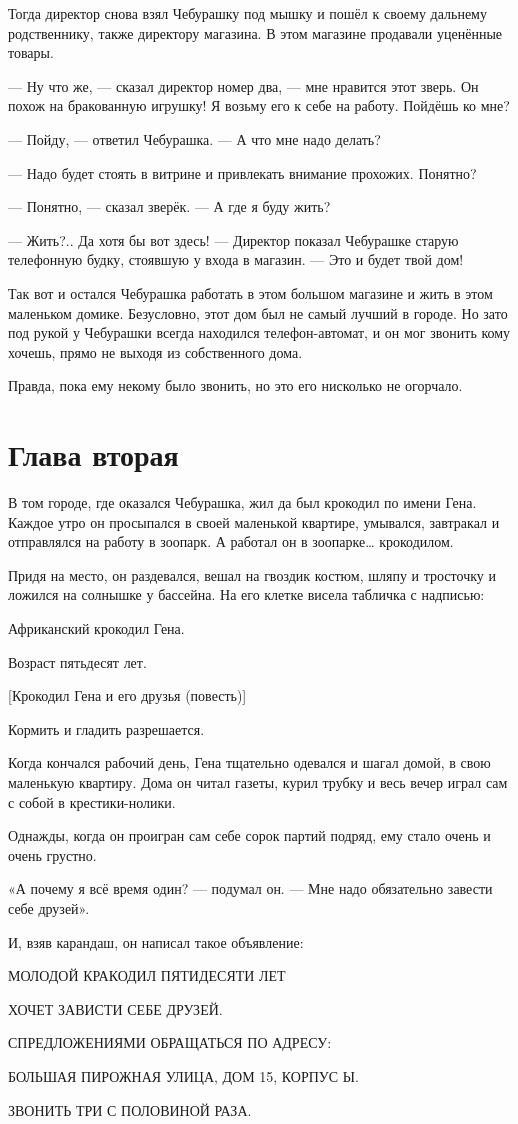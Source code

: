 Тогда директор снова взял Чебурашку под мышку и пошёл к своему дальнему родственнику, также директору магазина. В этом магазине продавали уценённые товары.

— Ну что же, — сказал директор номер два, — мне нравится этот зверь. Он похож на бракованную игрушку! Я возьму его к себе на работу. Пойдёшь ко мне?

— Пойду, — ответил Чебурашка. — А что мне надо делать?

— Надо будет стоять в витрине и привлекать внимание прохожих. Понятно?

— Понятно, — сказал зверёк. — А где я буду жить?

— Жить?.. Да хотя бы вот здесь! — Директор показал Чебурашке старую телефонную будку, стоявшую у входа в магазин. — Это и будет твой дом!

Так вот и остался Чебурашка работать в этом большом магазине и жить в этом маленьком домике. Безусловно, этот дом был не самый лучший в городе. Но зато под рукой у Чебурашки всегда находился телефон-автомат, и он мог звонить кому хочешь, прямо не выходя из собственного дома.

Правда, пока ему некому было звонить, но это его нисколько не огорчало.

\section{Глава вторая}

В том городе, где оказался Чебурашка, жил да был крокодил по имени Гена. Каждое утро он просыпался в своей маленькой квартире, умывался, завтракал и отправлялся на работу в зоопарк. А работал он в зоопарке… крокодилом.

Придя на место, он раздевался, вешал на гвоздик костюм, шляпу и тросточку и ложился на солнышке у бассейна. На его клетке висела табличка с надписью:

Африканский крокодил Гена.

Возраст пятьдесят лет.

[Крокодил Гена и его друзья (повесть)]

Кормить и гладить разрешается.

Когда кончался рабочий день, Гена тщательно одевался и шагал домой, в свою маленькую квартиру. Дома он читал газеты, курил трубку и весь вечер играл сам с собой в крестики-нолики.

Однажды, когда он проигран сам себе сорок партий подряд, ему стало очень и очень грустно.

«А почему я всё время один? — подумал он. — Мне надо обязательно завести себе друзей».

И, взяв карандаш, он написал такое объявление:

МОЛОДОЙ КРАКОДИЛ ПЯТИДЕСЯТИ ЛЕТ

ХОЧЕТ ЗАВИСТИ СЕБЕ ДРУЗЕЙ.

СПРЕДЛОЖЕНИЯМИ ОБРАЩАТЬСЯ ПО АДРЕСУ:

БОЛЬШАЯ ПИРОЖНАЯ УЛИЦА, ДОМ 15, КОРПУС Ы.

ЗВОНИТЬ ТРИ С ПОЛОВИНОЙ РАЗА.

